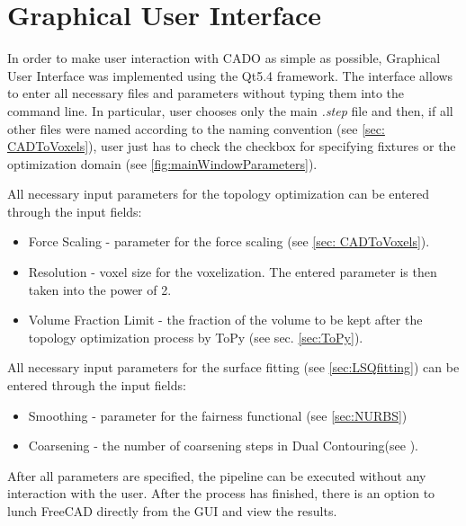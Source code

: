 \section{Graphical User Interface}
\label{sec:gui}
In order to make user interaction with CADO as simple as possible, Graphical User Interface was implemented using the Qt5.4 \cite{Qt} framework. 
The interface allows to enter all necessary files and parameters without typing them into the command line. In particular, user chooses only the main \textit{.step} file and then, if all other files were named according to the naming convention (see \autoref{sec: CADToVoxels}), user just has to check the checkbox for specifying fixtures or the optimization domain (see \autoref{fig:mainWindowParameters}).

All necessary input parameters for the topology optimization can be entered through the input fields:
\begin{itemize}
\item Force Scaling - parameter for the force scaling (see \autoref{sec: CADToVoxels}).
\item Resolution - voxel size for the voxelization. The entered parameter is then taken into the power of 2.
\item Volume Fraction Limit - the fraction of the volume to be kept after the topology optimization process by ToPy (see sec. \ref{sec:ToPy}).
\end{itemize}
All necessary input parameters for the surface fitting (see \autoref{sec:LSQfitting}) can be entered through the input fields:
\begin{itemize}
\item Smoothing - parameter for the fairness functional (see \autoref{sec:NURBS})
\item Coarsening - the number of coarsening steps in Dual Contouring(see ).
\end{itemize}

After all parameters are specified, the pipeline can  be executed without any interaction with the user. After the process has finished, there is an option to lunch FreeCAD directly from the GUI  and view the results.

\enlargethispage{5cm}

